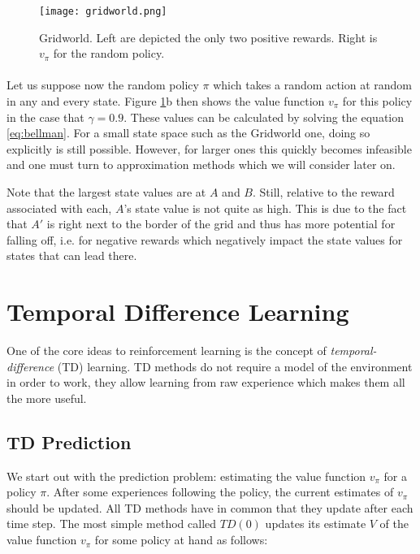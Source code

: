 \begin{figure}[htpb]
  \centering
  \texttt{[image: gridworld.png]}
  \caption[Gridworld]{
    Gridworld.
    Left are depicted the only two positive rewards.
    Right is $v_\pi$ for the random policy.
    \parencite{sutton1998book}
  }
  \label{fig:gridworld}
\end{figure}

\paragraph{}
Let us suppose now the random policy $\pi$
which takes a random action at random in any and every state.
Figure \ref{fig:gridworld}b then shows the value function $v_\pi$
for this policy in the case that $\gamma=0.9$.
These values can be calculated by solving the equation \ref{eq:bellman}.
For a small state space such as the Gridworld one, doing so explicitly
is still possible.
However, for larger ones this quickly becomes infeasible
and one must turn to approximation methods
which we will consider later on.

Note that the largest state values are at $A$ and $B$.
Still, relative to the reward associated with each,
$A$'s state value is not quite as high.
This is due to the fact that $A'$
is right next to the border of the grid
and thus has more potential for falling off,
i.e. for negative rewards which negatively impact
the state values for states that can lead there.

\section{Temporal Difference Learning}

One of the core ideas to reinforcement learning
is the concept of \textit{temporal-difference} (TD) learning.
TD methods do not require a model of the environment
in order to work,
they allow learning from raw experience
which makes them all the more useful.

\subsection{TD Prediction}
We start out with the prediction problem:
estimating the value function $v_\pi$ for a policy $\pi$.
After some experiences following the policy,
the current estimates of $v_\pi$ should be updated.
All TD methods have in common that they update after each time step.
The most simple method called $TD(0)$
updates its estimate $V$ of the value function $v_\pi$
for some policy at hand as follows:

